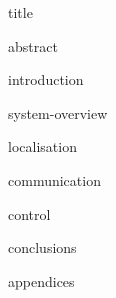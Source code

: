\documentclass[11pt,titlepage]{report}
\begin{document}
{title}

\clearpage
{abstract}
\tableofcontents
				
\clearpage
{}
{introduction}

{system-overview}

{localisation}

{communication}

{control}

{conclusions}

\clearpage
{}
\printbibliography[heading=bibintoc]

\clearpage
{appendices}
\end{document}
